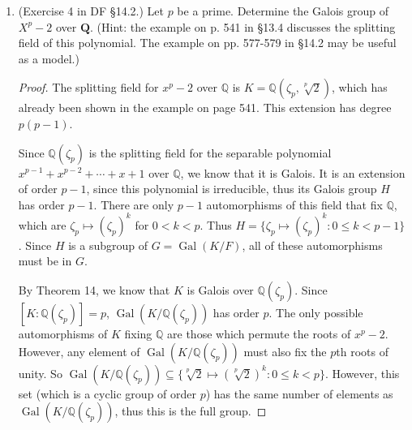 \documentclass[10pt]{article}
\newcommand{\Q}{\mathbb{Q}}
\DeclareMathOperator*{\Gal}{Gal}
\begin{document}
\begin{enumerate}
\begin{proof}
\begin{figure}[h!]
\begin{center}
\end{center}
\end{figure}
\end{proof}

\pagebreak
\item (Exercise 4 in DF \S 14.2.) Let $p$ be a prime.  Determine the Galois group of $X^p-2$ over $\mathbf{Q}$.  (Hint: the example on p. 541 in \S 13.4 discusses the splitting field of this polynomial.  The example on pp. 577-579 in \S 14.2 may be useful as a model.)

\begin{proof}

The splitting field for $x^p - 2$ over $\Q$ is $K = \Q(\zeta_p, \sqrt[p]{2})$, which has already been shown in the example on page 541.  This extension has degree $p(p-1)$.

Since $\Q(\zeta_p)$ is the splitting field for the separable polynomial $x^{p-1} + x^{p-2} + \cdots + x + 1$ over $\Q$, we know that it is Galois.  It is an extension of order $p-1$, since this polynomial is irreducible, thus its Galois group $H$ has order $p-1$.  There are only $p-1$ automorphisms of this field that fix $\Q$, which are $\zeta_p \mapsto (\zeta_p)^k$ for $0 < k < p$.  Thus $H = \{\zeta_p \mapsto (\zeta_p)^k : 0 \leq k < p-1 \}$.  Since $H$ is a subgroup of $G = \Gal(K/F)$, all of these automorphisms must be in $G$.

By Theorem 14, we know that $K$ is Galois over $\Q(\zeta_p)$.  Since $[K : \Q(\zeta_p)] = p$, $\Gal(K / \Q(\zeta_p))$ has order $p$.  The only possible automorphisms of $K$ fixing $\Q$ are those which permute the roots of $x^p -2$.  However, any element of $\Gal(K / \Q(\zeta_p))$ must also fix the $p$th roots of unity.  So $\Gal(K / \Q(\zeta_p)) \subseteq \{\sqrt[p]{2} \mapsto (\sqrt[p]{2})^k : 0 \leq k < p \}$.  However, this set (which is a cyclic group of order $p$) has the same number of elements as $\Gal(K / \Q(\zeta_p))$, thus this is the full group.


\end{proof}
\end{enumerate}
\end{document}
